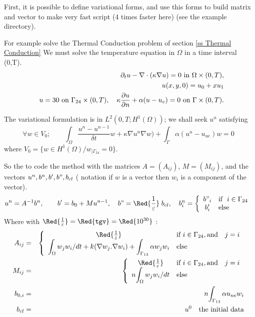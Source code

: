 \documentclass[a4paper,twoside,12pt]{book}
\def\p{\partial}
\def\hrefexample#1#2{\href{http://www.freefem.org/ff++/ff++/examples++-#1/#2}{\color{purple}{\texttt{#2 in #1}}}}
\begin{document}
 First, it is possible to define variational forms, and use this forms to build matrix 
  and vector to make very fast script (4 times faster here) (see the example  \hrefexample{chapt3}{Heat.edp}  directory).
  
  For example solve the Thermal Conduction problem of section \ref{ss Thermal Conduction}
  We must solve the temperature equation in $\Omega$ in a time interval (0,T).
{\begin{eqnarray}&&
    \p_t u -\nabla\cdot(\kappa\nabla u)=0 \hbox{ in } \Omega\times(0,T),
    \cr&&
    u(x,y,0)=u_0+x u_1
    \cr&&
   u = 30 \hbox{ on } \Gamma_{24}\times(0,T) , \quad  \kappa\frac{\p u}{\p n} +\alpha(u-u_e)=0\hbox{ on } \Gamma\times(0,T).
\end{eqnarray}}
  
 The variational formulation is  in {$L^2(0,T;H^1(\Omega))$};
  we shall seek $u^n$ satisfying
{\[
\forall w \in V_{0}; \qquad   \int_\Omega \frac{u^n-u^{n-1}}{\delta t} w + \kappa\nabla u^n\nabla w) +\int_\Gamma\alpha(u^n-u_{ue})w=0
\]}
where {$ V_0 = \{w\in H^1(\Omega)/ w_{|\Gamma_{24}}=0\}$}.

So the to code the method with the matrices $A=(A_{ij})$, $M=(M_{ij})$, and  the vectors 
$ u^n, b^n, b',b", b_{cl}$ 
( notation if $w$ is a vector then $w_i$ is a component of the vector).
\def\tgv{\Red{{\frac{1}{\varepsilon}}}}
{$$ u^n = A^{-1} b^n, \quad
  \quad b' = b_0 + M u^{n-1}, 
  \quad b"=  \tgv \; b_{cl} , 
  \quad  b^n_i = \left\{
  \begin{array}{cl}   b"_i  & \mbox{if }\ i \in \Gamma_{24} \\
                       b'_i & \mbox{else } %
                        \end{array}\right.
                       \label{eq tgv}  $$}
Where with $ \tgv = \Red{\mathtt{tgv}} = \Red{10^{30}}$ :
\begin{eqnarray*}
 A_{ij} &=& \left\{\begin{array}{cl}   \tgv  & \mbox{if } i  \in \Gamma_{24}, \mbox{and}\quad  j=i \\  
\displaystyle 
 {\int_{\Omega} w_j w_i / dt + k (\nabla w_j. \nabla w_i ) + \int_{\Gamma_{13}} \alpha w_j w_i} & \mbox{else } %
 \end{array}\right.  \\ 
 M_{ij} &=& \left\{\begin{array}{cl}   \tgv & \mbox{if } i  \in \Gamma_{24}, \mbox{and}\quad  j=i  \\  
\displaystyle 
  n{\int_{\Omega} w_j w_i / dt}
 & \mbox{else  } %
   \end{array}\right. \\ 
 b_{0,i} &=&  n{\int_{\Gamma_{13}} \alpha u_{ue} w_i } \\
 b_{cl} &=& u^{0}  \quad \mbox{the initial data} 
\end{eqnarray*}
\end{document}
